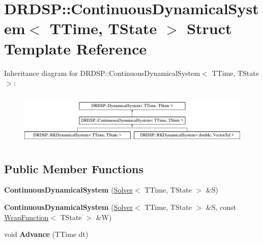 \hypertarget{struct_d_r_d_s_p_1_1_continuous_dynamical_system}{\section{D\-R\-D\-S\-P\-:\-:Continuous\-Dynamical\-System$<$ T\-Time, T\-State $>$ Struct Template Reference}
\label{struct_d_r_d_s_p_1_1_continuous_dynamical_system}
}
Inheritance diagram for D\-R\-D\-S\-P\-:\-:Continuous\-Dynamical\-System$<$ T\-Time, T\-State $>$\-:\begin{figure}[H]
\begin{center}
\leavevmode
\includegraphics[height=2.537765cm]{struct_d_r_d_s_p_1_1_continuous_dynamical_system}
\end{center}
\end{figure}
\subsection*{Public Member Functions}
\begin{DoxyCompactItemize}
\item 
\hypertarget{struct_d_r_d_s_p_1_1_continuous_dynamical_system_acc32849f074ae91f4d46cfbd26f34fa3}{{\bfseries Continuous\-Dynamical\-System} (\hyperlink{struct_d_r_d_s_p_1_1_solver}{Solver}$<$ T\-Time, T\-State $>$ \&S)}\label{struct_d_r_d_s_p_1_1_continuous_dynamical_system_acc32849f074ae91f4d46cfbd26f34fa3}

\item 
\hypertarget{struct_d_r_d_s_p_1_1_continuous_dynamical_system_a20bfbacb5264a804b11c950439fe4c08}{{\bfseries Continuous\-Dynamical\-System} (\hyperlink{struct_d_r_d_s_p_1_1_solver}{Solver}$<$ T\-Time, T\-State $>$ \&S, const \hyperlink{struct_d_r_d_s_p_1_1_wrap_function}{Wrap\-Function}$<$ T\-State $>$ \&W)}\label{struct_d_r_d_s_p_1_1_continuous_dynamical_system_a20bfbacb5264a804b11c950439fe4c08}

\item 
\hypertarget{struct_d_r_d_s_p_1_1_continuous_dynamical_system_ac6b77bbecb35c1da88497de317a3b50d}{void {\bfseries Advance} (T\-Time dt)}\label{struct_d_r_d_s_p_1_1_continuous_dynamical_system_ac6b77bbecb35c1da88497de317a3b50d}

\end{DoxyCompactItemize}
